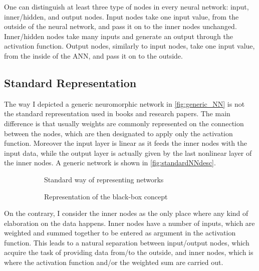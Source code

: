One can distinguish at least three type of nodes in every neural network: input, inner/hidden, and output nodes.
Input nodes take one input value, from the outside of the neural network, and pass it on to the inner nodes unchanged.
Inner/hidden nodes take many inputs and generate an output through the activation function.
Output nodes, similarly to input nodes, take one input value, from the inside of the \acs{ANN}, and pass it on to the outside.

\subsection*{Standard Representation}
The way I depicted a generic neuromorphic network in \autoref{fig:generic_NN} is not the standard representation used in books and research papers.
The main difference is that usually weights are commonly represented on the connection between the nodes, which are then designated to apply only the activation function.
Moreover the input layer is linear as it feeds the inner nodes with the input data, while the output layer is actually given by the last nonlinear layer of the inner nodes.
A generic network is shown in \autoref{fig:standardNNdesc}.

\begin{figure}[ht]
	\begin{subfigure}[b]{0.49\textwidth}
		\centering
		
		\caption{Standard way of representing networks}
		\label{fig:standardNNdesc}
  \end{subfigure}
  \begin{subfigure}[b]{0.49\textwidth}
  		\centering
		
		\caption{Representation of the black-box concept}
		\label{fig:black_box_NN}
  \end{subfigure}
  \caption{}
  	\label{fig:description_comparison}
\end{figure}

On the contrary, I consider the inner nodes as the only place where any kind of elaboration on the data happens.
Inner nodes have a number of inputs, which are weighted and summed together to be entered as argument in the activation function.
This leads to a natural separation between input/output nodes, which acquire the task of providing data from/to the outside, and inner nodes, which is where the activation function and/or the weighted sum are carried out.

